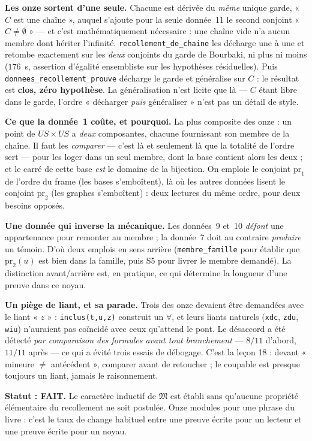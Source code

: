\textbf{Les onze sortent d'une seule.} Chacune est dérivée du \emph{même} unique
garde, « $C$ est une chaîne », auquel s'ajoute pour la seule donnée~11 le second
conjoint « $C \neq \emptyset$ » --- et c'est mathématiquement nécessaire : une
chaîne vide n'a aucun membre dont hériter l'infinité. \texttt{recollement\_de\_chaine}
les décharge une à une et retombe exactement sur les \emph{deux} conjoints du garde
de Bourbaki, ni plus ni moins ($176$~s, assertion d'égalité ensembliste sur les
hypothèses résiduelles). Puis \texttt{donnees\_recollement\_prouve} décharge le
garde et généralise sur $C$ : le résultat est \textbf{clos, zéro hypothèse}. La
généralisation n'est licite que là --- $C$ étant libre dans le garde, l'ordre
« décharger \emph{puis} généraliser » n'est pas un détail de style.

\textbf{Ce que la donnée~1 coûte, et pourquoi.} La plus composite des onze : un
point de $US\times US$ a \emph{deux} composantes, chacune fournissant son membre de
la chaîne. Il faut les \emph{comparer} --- c'est là et seulement là que la totalité
de l'ordre sert --- pour les loger dans un seul membre, dont la base contient alors
les deux ; et le carré de cette base \emph{est} le domaine de la bijection. On
emploie le conjoint $\mathrm{pr}_1$ de l'ordre du frame (les bases s'emboîtent), là
où les autres données lisent le conjoint $\mathrm{pr}_2$ (les graphes s'emboîtent) :
deux lectures du même ordre, pour deux besoins opposés.

\textbf{Une donnée qui inverse la mécanique.} Les données~9 et~10 \emph{défont} une
appartenance pour remonter au membre ; la donnée~7 doit au contraire \emph{produire}
un témoin. D'où deux emplois en sens arrière (\texttt{membre\_famille} pour établir
que $\mathrm{pr}_2(u)$ est bien dans la famille, puis S5 pour livrer le membre
demandé). La distinction avant/arrière est, en pratique, ce qui détermine la
longueur d'une preuve dans ce noyau.

\textbf{Un piège de liant, et sa parade.} Trois des onze devaient être demandées
avec le liant « $z$ » : \texttt{inclus(t,u,z)} construit un $\forall$, et leurs
liants naturels (\texttt{xdc}, \texttt{zdu}, \texttt{wiu}) n'auraient pas coïncidé
avec ceux qu'attend le pont. Le désaccord a été détecté \emph{par comparaison des
formules avant tout branchement} --- $8/11$ d'abord, $11/11$ après --- ce qui a
évité trois essais de débogage. C'est la leçon 18 : devant « mineure $\neq$
antécédent », comparer avant de retoucher ; le coupable est presque toujours un
liant, jamais le raisonnement.

\textbf{Statut : FAIT.} Le caractère inductif de $\mathfrak{M}$ est établi sans
qu'aucune propriété élémentaire du recollement ne soit postulée. Onze modules pour
une phrase du livre : c'est le taux de change habituel entre une preuve écrite pour
un lecteur et une preuve écrite pour un noyau.
